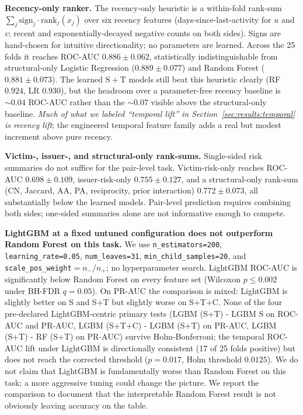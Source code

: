 \documentclass[conference]{IEEEtran}
\newcommand{\code}[1]{\texttt{#1}}
\begin{document}
\textbf{Recency-only ranker.} The recency-only heuristic is a
within-fold rank-sum
$\sum_j \mathrm{sign}_j \cdot \mathrm{rank}_j(x_j)$ over six recency
features (days-since-last-activity for $u$ and $v$; recent and
exponentially-decayed negative counts on both sides). Signs are
hand-chosen for intuitive directionality; no parameters are learned.
Across the 25 folds it reaches ROC-AUC
$0.886 \pm 0.062$, statistically indistinguishable from
structural-only Logistic Regression ($0.889 \pm 0.077$) and Random
Forest ($0.881 \pm 0.073$). The learned $\mathrm{S}{+}\mathrm{T}$
models still beat this heuristic clearly (RF $0.924$, LR $0.930$),
but the headroom over a parameter-free recency baseline is
$\sim 0.04$ ROC-AUC rather than the $\sim 0.07$ visible above the
structural-only baseline. \emph{Much of what we labeled ``temporal
lift'' in Section~\ref{sec:results:temporal} is recency lift}; the
engineered temporal feature family adds a real but modest increment
above pure recency.

\textbf{Victim-, issuer-, and structural-only rank-sums.}
Single-sided risk summaries do not suffice for the pair-level task.
Victim-risk-only reaches ROC-AUC $0.698 \pm 0.109$, issuer-risk-only
$0.755 \pm 0.127$, and a structural-only rank-sum (CN, Jaccard, AA,
PA, reciprocity, prior interaction) $0.772 \pm 0.073$, all
substantially below the learned models. Pair-level prediction
requires combining both sides; one-sided summaries alone are not
informative enough to compete.

\textbf{LightGBM at a fixed untuned configuration does not
outperform Random Forest on this task.} We use
\code{n\_estimators=200}, \code{learning\_rate=0.05},
\code{num\_leaves=31}, \code{min\_child\_samples=20}, and
\code{scale\_pos\_weight}$ = n_-/n_+$; no hyperparameter search.
LightGBM ROC-AUC is significantly below Random Forest on every
feature set (Wilcoxon $p \leq 0.002$ under BH-FDR $q = 0.05$). On
PR-AUC the comparison is mixed: LightGBM is slightly better on S
and S$+$T but slightly worse on S$+$T$+$C. None of the four
pre-declared LightGBM-centric primary tests
(LGBM (S+T) - LGBM S on ROC-AUC and PR-AUC, LGBM (S+T+C) - LGBM
(S+T) on PR-AUC, LGBM (S+T) - RF (S+T) on PR-AUC) survive
Holm-Bonferroni; the temporal ROC-AUC lift under LightGBM is
directionally consistent (17 of 25 folds positive) but does not
reach the corrected threshold ($p = 0.017$, Holm threshold
$0.0125$). We do not claim that LightGBM is fundamentally worse than
Random Forest on this task; a more aggressive tuning could change the
picture. We report the comparison to document that the interpretable
Random Forest result is not obviously leaving accuracy on the table.
\end{document}
